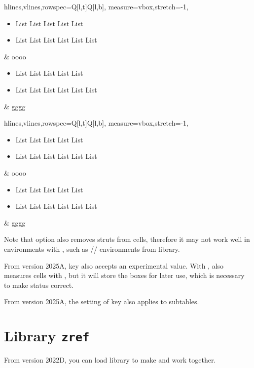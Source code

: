 \documentclass[oneside]{book}
\begin{document}
{\centering\begin{tblr}{
  hlines,vlines,rowspec={Q[l,t]Q[l,b]},
  measure=vbox,stretch=-1,
}
  \begin{itemize}[nosep]
    \item List List List List List
    \item List List List List List List
  \end{itemize} & oooo \\
  \begin{itemize}[nosep]
    \item List List List List List
    \item List List List List List List
  \end{itemize} & gggg \\
\end{tblr}\par}

\begin{codehigh}
\begin{tblr}{
  hlines,vlines,rowspec={Q[l,t]Q[l,b]},
  measure=vbox,stretch=-1,
}
  \begin{itemize}[nosep]
    \item List List List List List
    \item List List List List List List
  \end{itemize} & oooo \\
  \begin{itemize}[nosep]
    \item List List List List List
    \item List List List List List List
  \end{itemize} & gggg \\
\end{tblr}
\end{codehigh}

Note that option  also removes struts from cells, therefore it may not work well
in  environments with , such as
// environments from  library.

From version 2025A,  key also accepts an experimental  value.
With ,  also measures cells with \CC{\vbox},
but it will store the boxes for later use,
which is necessary to make \CC{\lTblrMeasuringBool} status correct.

From version 2025A, the setting of  key also applies to subtables.

\section{Library \texttt{zref}}

From version 2022D, you can load  library
to make \CC{\zref} and  work together.
\end{document}
